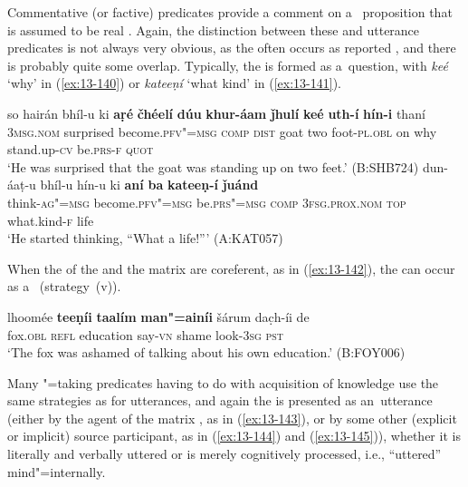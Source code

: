  \hspace{-1mm}Commentative (or factive) predicates provide a comment on a~ proposition that is assumed to be real \citep[127--129]{noonan2007}. Again, the distinction between these and utterance predicates is not always very obvious, as the  often occurs as reported , and there is probably quite some overlap. Typically, the  is formed as a~question, with \textit{keé} `why' in (\ref{ex:13-140}) or \textit{kateeṇí} `what kind' in (\ref{ex:13-141}).

\ea
\label{ex:13-140}
\gll so hairán bhíl-u ki \textbf{aṛé} \textbf{čhéelí} \textbf{dúu} \textbf{khur-áam} \textbf{ǰhulí} \textbf{keé} \textbf{uth-í} \textbf{hín-i} thaní\\
\textsc{3msg.nom}  surprised become.\textsc{pfv"=msg} \textsc{comp} \textsc{dist} goat  two foot-\textsc{pl.obl} on why stand.up-\textsc{cv} be.\textsc{prs-f} \textsc{quot} \\
\glt `He was surprised that the goat was standing up on two feet.' (B:SHB724)
\ex
\label{ex:13-141}
\gll dun-áaṭ-u bhíl-u hín-u ki \textbf{aní} \textbf{ba} \textbf{kateeṇ-í} \textbf{ǰuánd}\\
think-\textsc{ag"=msg} become.\textsc{pfv"=msg} be.\textsc{prs"=msg} \textsc{comp} \textsc{3fsg.prox.nom} \textsc{top} what.kind-\textsc{f} life\\
\glt `He started thinking, ``What a life!''' (A:KAT057) 
\z

When the  of the  and the matrix  are coreferent, as in (\ref{ex:13-142}), the  can occur as a~ (strategy~(v)).

\begin{exe}
\ex
\label{ex:13-142}
\gll lhoomée \textbf{teeṇíi} \textbf{taalím} \textbf{man"=ainíi} šárum  dac̣h-íi de \\
fox.\textsc{obl} \textsc{ refl} education say-\textsc{vn} shame look-\textsc{3sg} \textsc{pst} \\
\glt `The fox was ashamed of talking about his own education.' (B:FOY006) 
\end{exe}

 \hspace{-2mm}Many "=taking predicates having to do with acquisition of knowledge use the same strategies as for utterances, and again the  is presented as an~utterance (either by the agent of the matrix , as in (\ref{ex:13-143}), or by some other (explicit or implicit) source participant, as in (\ref{ex:13-144}) and (\ref{ex:13-145})), whether it is literally and verbally uttered or is merely cognitively processed, i.e., ``uttered'' mind"=internally. 

